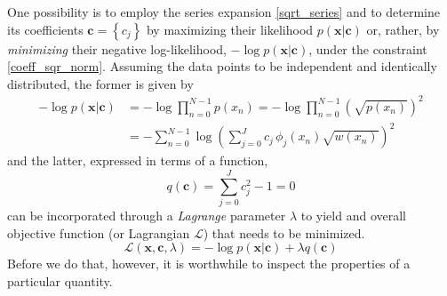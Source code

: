 \documentclass[]{report}
\begin{document}
	One possibility is to employ the series expansion \ref{sqrt_series} and to determine its coefficients $\mathbf{c}=\left\{c_j\right\}$ by maximizing their likelihood $p(\mathbf{x}\vert\mathbf{c})$ or, rather, by \emph{minimizing} their negative log-likelihood, $-\log p(\mathbf{x}\vert\mathbf{c})$, under the constraint \ref{coeff_sqr_norm}. Assuming the data points to be independent and identically distributed, the former is given by
	\begin{align}\label{log_likelihood}
		-\log p(\mathbf{x}\vert\mathbf{c}) & = -\log\prod_{n=0}^{N-1}p(x_n) = -\log\prod_{n=0}^{N-1}\left(\sqrt{p(x_n)}\right)^2 \nonumber \\
		& = -\sum_{n=0}^{N-1}\log\left(\sum_{j=0}^{J}c_j\,\phi_j(x_n)\sqrt{w(x_n)}\right)^2
	\end{align}
	and the latter, expressed in terms of a function,
	\begin{equation}\label{constraint}
		q(\mathbf{c}) = \sum_{j=0}^{J}c_j^2 - 1 = 0
	\end{equation}
	can be incorporated through a \emph{Lagrange} parameter $\lambda$ to yield and overall objective function (or Lagrangian $\mathcal{L}$) that needs to be minimized.
	\begin{equation}\label{lagrangian}
		\mathcal{L}(\mathbf{x},\mathbf{c},\lambda) = -\log p(\mathbf{x}\vert\mathbf{c}) + \lambda q(\mathbf{c})
	\end{equation}
	Before we do that, however, it is worthwhile to inspect the properties of a particular quantity.
	
\end{document}
